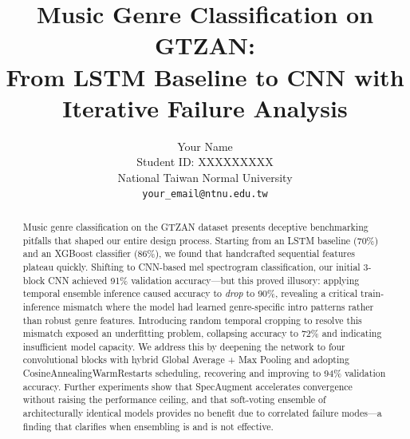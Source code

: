 %
%

\title{Music Genre Classification on GTZAN:\\From LSTM Baseline to CNN with Iterative Failure Analysis}

\author{
  Your Name \\
  Student ID: XXXXXXXXX \\
  National Taiwan Normal University \\
  {\tt\small your\_email@ntnu.edu.tw}
}

\maketitle

\begin{abstract}
Music genre classification on the GTZAN dataset presents deceptive benchmarking pitfalls that shaped our entire design process. Starting from an LSTM baseline (70\%) and an XGBoost classifier (86\%), we found that handcrafted sequential features plateau quickly. Shifting to CNN-based mel spectrogram classification, our initial 3-block CNN achieved 91\% validation accuracy---but this proved illusory: applying temporal ensemble inference caused accuracy to \emph{drop} to 90\%, revealing a critical train-inference mismatch where the model had learned genre-specific intro patterns rather than robust genre features. Introducing random temporal cropping to resolve this mismatch exposed an underfitting problem, collapsing accuracy to 72\% and indicating insufficient model capacity. We address this by deepening the network to four convolutional blocks with hybrid Global Average + Max Pooling and adopting CosineAnnealingWarmRestarts scheduling, recovering and improving to 94\% validation accuracy. Further experiments show that SpecAugment accelerates convergence without raising the performance ceiling, and that soft-voting ensemble of architecturally identical models provides no benefit due to correlated failure modes---a finding that clarifies when ensembling is and is not effective.
\end{abstract}

